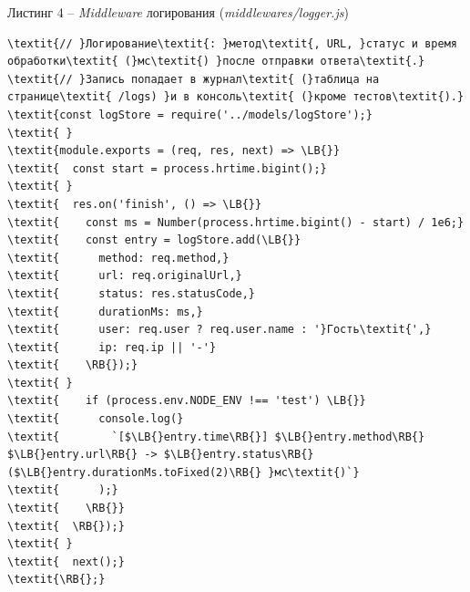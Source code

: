 \documentclass[14pt,a4paper]{extarticle}
\newcommand{\LB}{\char123}
\newcommand{\RB}{\char125}
\begin{document}
\noindent\vspace{18pt}\par\nopagebreak\noindent Листинг 4 – \textit{Middleware} логирования (\textit{middlewares/logger.js})\par\nopagebreak
\begin{Verbatim}[commandchars=\\\{\},fontsize=\small,baselinestretch=1]
\textit{// }Логирование\textit{: }метод\textit{, URL, }статус и время обработки\textit{ (}мс\textit{) }после отправки ответа\textit{.}
\textit{// }Запись попадает в журнал\textit{ (}таблица на странице\textit{ /logs) }и в консоль\textit{ (}кроме тестов\textit{).}
\textit{const logStore = require('../models/logStore');}
\textit{ }
\textit{module.exports = (req, res, next) => \LB{}}
\textit{  const start = process.hrtime.bigint();}
\textit{ }
\textit{  res.on('finish', () => \LB{}}
\textit{    const ms = Number(process.hrtime.bigint() - start) / 1e6;}
\textit{    const entry = logStore.add(\LB{}}
\textit{      method: req.method,}
\textit{      url: req.originalUrl,}
\textit{      status: res.statusCode,}
\textit{      durationMs: ms,}
\textit{      user: req.user ? req.user.name : '}Гость\textit{',}
\textit{      ip: req.ip || '-'}
\textit{    \RB{});}
\textit{ }
\textit{    if (process.env.NODE_ENV !== 'test') \LB{}}
\textit{      console.log(}
\textit{        `[$\LB{}entry.time\RB{}] $\LB{}entry.method\RB{} $\LB{}entry.url\RB{} -> $\LB{}entry.status\RB{} ($\LB{}entry.durationMs.toFixed(2)\RB{} }мс\textit{)`}
\textit{      );}
\textit{    \RB{}}
\textit{  \RB{});}
\textit{ }
\textit{  next();}
\textit{\RB{};}
\end{Verbatim}
\vspace{18pt}
\end{document}
